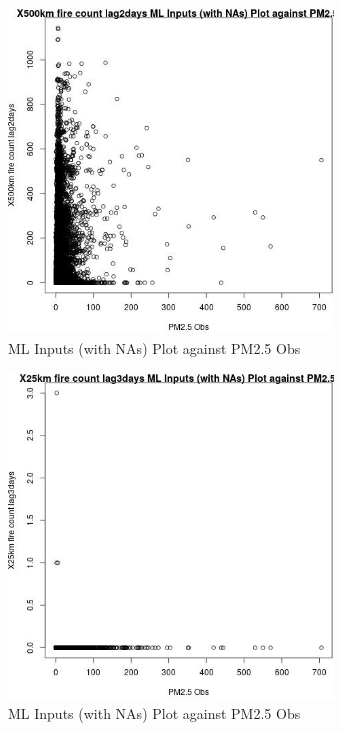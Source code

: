 \begin{figure} 
\centering  
\includegraphics[width=0.77\textwidth]{Code_Outputs/Report_ML_input_PM25_Step4_part_e_de_duplicated_aves_compiled_2019-05-14wNAs_X500km_fire_count_lag2daysvPM25_Obs.jpg} 
\caption{\label{fig:Report_ML_input_PM25_Step4_part_e_de_duplicated_aves_compiled_2019-05-14wNAsX500km_fire_count_lag2daysvPM25_Obs}ML Inputs (with NAs) Plot against PM2.5 Obs} 
\end{figure} 
 

\begin{figure} 
\centering  
\includegraphics[width=0.77\textwidth]{Code_Outputs/Report_ML_input_PM25_Step4_part_e_de_duplicated_aves_compiled_2019-05-14wNAs_X25km_fire_count_lag3daysvPM25_Obs.jpg} 
\caption{\label{fig:Report_ML_input_PM25_Step4_part_e_de_duplicated_aves_compiled_2019-05-14wNAsX25km_fire_count_lag3daysvPM25_Obs}ML Inputs (with NAs) Plot against PM2.5 Obs} 
\end{figure} 
 

